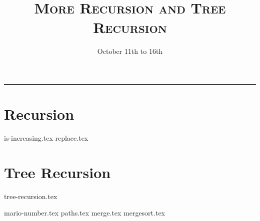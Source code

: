 \documentclass{exam}
\title{\textsc{More Recursion and Tree Recursion}}
\date{October 11th to 16th}
\begin{document}
\maketitle
\rule{\textwidth}{0.15em}
\fontsize{12}{15}\selectfont


\section{Recursion}
\begin{questions}
{is-increasing.tex}
{replace.tex}
\newpage
\end{questions}

\section{Tree Recursion}
{tree-recursion.tex}
\begin{questions}
\pagebreak
{mario-number.tex}
\pagebreak
{paths.tex}
\pagebreak
{merge.tex}
{mergesort.tex}

\end{questions}
\end{document}
